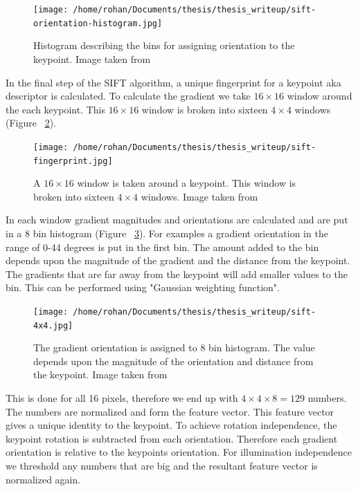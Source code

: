 \documentclass[12pt]{dalcsthesis}
\begin{document}
\begin{figure}
  \centering
     {\texttt{[image: /home/rohan/Documents/thesis/thesis\_writeup/sift-orientation-histogram.jpg]}}
  \caption{\label{fig- sift bin histogram} Histogram describing the bins for assigning orientation to the keypoint. Image taken from \cite{sift_url}}
\end{figure}

In the final step of the SIFT algorithm, a unique fingerprint for a keypoint aka descriptor is calculated. To calculate the gradient we take $16 \times 16$ window around the each keypoint. This $16 \times 16$ window is broken into sixteen $4 \times 4$ windows (Figure ~\ref{fig- sift bin fingerprint}).

\begin{figure}
  \centering
     {\texttt{[image: /home/rohan/Documents/thesis/thesis\_writeup/sift-fingerprint.jpg]}}
  \caption{\label{fig- sift bin fingerprint} A $16 \times 16$ window is taken around a keypoint. This window is broken into sixteen $4 \times 4$ windows. Image taken from \cite{sift_url}}
\end{figure}

In each window gradient magnitudes and orientations are calculated and are put in a 8 bin histogram (Figure ~\ref{fig- sift bin histogram gradient}). For examples a gradient orientation in the range of 0-44 degrees is put in the first bin. The amount added to the bin depends upon the magnitude of the gradient and the distance from the keypoint. The gradients that are far away from the keypoint will add smaller values to the bin. This can be performed using "Gaussian weighting function". 

\begin{figure}
  \centering
     {\texttt{[image: /home/rohan/Documents/thesis/thesis\_writeup/sift-4x4.jpg]}}
  \caption{\label{fig- sift bin histogram gradient} The gradient orientation is assigned to 8 bin histogram. The value depends upon the magnitude of the orientation and distance from the keypoint. Image taken from \cite{sift_url}}
\end{figure}

This is done for all 16 pixels, therefore we end up with $4 \times 4 \times 8=129$ numbers. The numbers are normalized and form the feature vector. This feature vector gives a unique identity to the keypoint. To achieve rotation independence, the keypoint rotation is subtracted from each orientation. Therefore each gradient orientation is relative to the keypoints orientation. For illumination independence we threshold any numbers that are big and the resultant feature vector is normalized again. 
\end{document}
